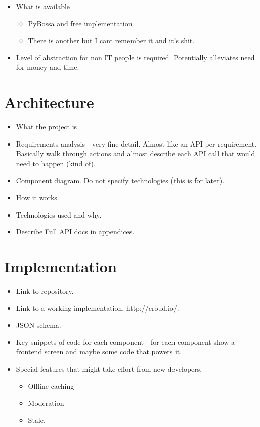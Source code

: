 \documentclass{article}
\let\oldsection\section
\renewcommand\section{\clearpage\oldsection}
\begin{document}
		\begin{itemize}
			\item What is available
			\begin{itemize}
				\item PyBossa and free implementation
				\item There is another but I cant remember it and it's shit.
			\end{itemize}
			\item Level of abstraction for non IT people is required. Potentially alleviates need for money and time.
		\end{itemize}

	\section{Architecture}
	\label{sec:architecture}
		\begin{itemize}
			\item What the project is
			\item Requirements analysis - very fine detail. Almost like an API per requirement. Basically walk through actions and almost describe each API call that would need to happen (kind of).
			\item Component diagram. Do not specify technologies (this is for later).
			\item How it works.
			\item Technologies used and why.
			\item Describe Full API docs in appendices.
		\end{itemize}

	\section{Implementation}
	\label{sec:implementation}
		\begin{itemize}
			\item Link to repository.
			\item Link to a working implementation. http://croud.io/.
			\item JSON schema.
			\item Key snippets of code for each component - for each component show a frontend screen and maybe some code that powers it.
			\item Special features that might take effort from new developers.
			\begin{itemize}
				\item Offline caching
				\item Moderation
				\item Stale.
			\end{itemize}
		\end{itemize}
\end{document}
